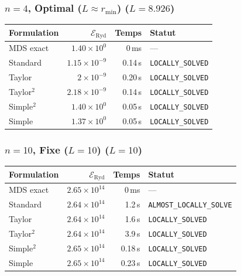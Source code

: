 \subsubsection{$n=4$, Optimal ($L{\approx}r_{\min}$) ($L=8.926$)}
\begin{longtable}{@{}lrrl@{}}
  \toprule
  Formulation & $\mathcal{E}_{\mathrm{Ryd}}$ & Temps & Statut \\
  \midrule
  \endhead
  MDS exact & $1.40\times10^{0}$ & 0\,ms & --- \\
  Standard & $1.15\times10^{-9}$ & 0.14\,s & \texttt{LOCALLY\_SOLVED} \\
  Taylor & $2\times10^{-9}$ & 0.20\,s & \texttt{LOCALLY\_SOLVED} \\
  Taylor$^2$ & $2.18\times10^{-9}$ & 0.14\,s & \texttt{LOCALLY\_SOLVED} \\
  Simple$^2$ & $1.40\times10^{0}$ & 0.05\,s & \texttt{LOCALLY\_SOLVED} \\
  Simple & $1.37\times10^{0}$ & 0.05\,s & \texttt{LOCALLY\_SOLVED} \\
  \bottomrule
\end{longtable}

\subsubsection{$n=10$, Fixe ($L{=}10$) ($L=10$)}
\begin{longtable}{@{}lrrl@{}}
  \toprule
  Formulation & $\mathcal{E}_{\mathrm{Ryd}}$ & Temps & Statut \\
  \midrule
  \endhead
  MDS exact & $2.65\times10^{14}$ & 0\,ms & --- \\
  Standard & $2.64\times10^{14}$ & 1.2\,s & \texttt{ALMOST\_LOCALLY\_SOLVE} \\
  Taylor & $2.64\times10^{14}$ & 1.6\,s & \texttt{LOCALLY\_SOLVED} \\
  Taylor$^2$ & $2.64\times10^{14}$ & 3.9\,s & \texttt{LOCALLY\_SOLVED} \\
  Simple$^2$ & $2.65\times10^{14}$ & 0.18\,s & \texttt{LOCALLY\_SOLVED} \\
  Simple & $2.65\times10^{14}$ & 0.23\,s & \texttt{LOCALLY\_SOLVED} \\
  \bottomrule
\end{longtable}


